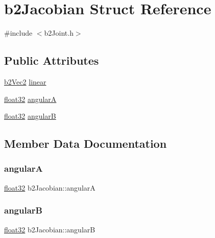\hypertarget{structb2_jacobian}{}\section{b2\+Jacobian Struct Reference}
\label{structb2_jacobian}


{\ttfamily \#include $<$b2\+Joint.\+h$>$}

\subsection*{Public Attributes}
\begin{DoxyCompactItemize}
\item 
\mbox{\hyperlink{structb2_vec2}{b2\+Vec2}} \mbox{\hyperlink{structb2_jacobian_aa63199b443d411972b9cb6aac6c7cb34}{linear}}
\item 
\mbox{\hyperlink{b2_settings_8h_aacdc525d6f7bddb3ae95d5c311bd06a1}{float32}} \mbox{\hyperlink{structb2_jacobian_a0669f849afcdc154b36f86cb0529d2bc}{angularA}}
\item 
\mbox{\hyperlink{b2_settings_8h_aacdc525d6f7bddb3ae95d5c311bd06a1}{float32}} \mbox{\hyperlink{structb2_jacobian_a3bbdbd8e46f4fa9be2e50434edaaeb14}{angularB}}
\end{DoxyCompactItemize}


\subsection{Member Data Documentation}
\mbox{\label{structb2_jacobian_a0669f849afcdc154b36f86cb0529d2bc}} 
\subsubsection{\texorpdfstring{angularA}{angularA}}
{\footnotesize\ttfamily \mbox{\hyperlink{b2_settings_8h_aacdc525d6f7bddb3ae95d5c311bd06a1}{float32}} b2\+Jacobian\+::angularA}

\mbox{\label{structb2_jacobian_a3bbdbd8e46f4fa9be2e50434edaaeb14}} 
\subsubsection{\texorpdfstring{angularB}{angularB}}
{\footnotesize\ttfamily \mbox{\hyperlink{b2_settings_8h_aacdc525d6f7bddb3ae95d5c311bd06a1}{float32}} b2\+Jacobian\+::angularB}

